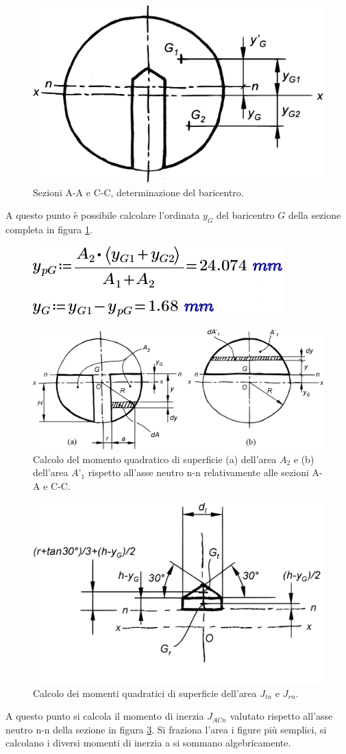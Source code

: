 \begin{figure}[H]
\centering
  \includegraphics[width=.35\textwidth]{imgs/Cap7/SezAsse3}
\caption{Sezioni A-A e C-C, determinazione del baricentro.}
\label{fig:SezAsse3}
\end{figure}
A questo punto è possibile calcolare l'ordinata $y_G$ del baricentro $G$ della sezione completa in figura \ref{fig:SezAsse3}.
\begin{figure}[H]
\centering
  \includegraphics[width=.3\textwidth]{imgs/MathAsse2_1}
\caption{}
\label{fig:MathAsse2_1}
\end{figure}
\begin{figure}[H]
\centering
  \includegraphics[width=.55\textwidth]{imgs/Cap7/SezAsse4}
\caption{Calcolo del momento quadratico di superficie (a) dell’area $A_2$ e (b) dell’area $A’_1$ rispetto all’asse neutro n-n relativamente alle sezioni A-A e C-C.}
\label{fig:SezAsse4}
\end{figure}
\begin{figure}[H]
\centering
  \includegraphics[width=.4\textwidth]{imgs/Cap7/SezAsse5}
\caption{Calcolo dei momenti quadratici di superficie dell’area $J_{tn}$ e $J_{rn}$.}
\label{fig:SezAsse5}
\end{figure}
A questo punto si calcola il momento di inerzia $J_{ACn}$ valutato rispetto all'asse neutro n-n della sezione in figura \ref{fig:SezAsse4}. Si fraziona l'area i figure più semplici, si calcolano i diversi momenti di inerzia a si sommano algebricamente. 
